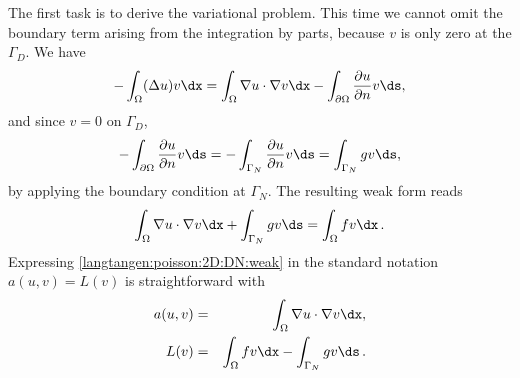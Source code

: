 The first task is to derive the variational problem. This time we
cannot omit the boundary term arising from the integration by parts,
because $v$ is only zero at the $\Gamma_D$. We have
\[
 -\int_\Omega (\Delta u)v \dx
= \int_\Omega\nabla u\cdot\nabla v\dx
  - \int_{\partial\Omega} \frac{\partial u}{\partial n}v\ds,
\]
and since $v=0$ on $\Gamma_D$,
\[
- \int_{\partial\Omega} \frac{\partial u}{\partial n}v\ds
=
- \int_{\Gamma_N} \frac{\partial u}{\partial n}v\ds
= \int_{\Gamma_N}gv\ds,
\]
by applying the boundary condition at $\Gamma_N$.
The resulting weak form reads
\begin{equation}
\int_{\Omega} \nabla u \cdot \nabla v \dx +
\int_{\Gamma_N} gv\ds
= \int_{\Omega} fv \dx\langtangenep
\label{langtangen:poisson:2D:DN:weak}
\end{equation}
Expressing \eqref{langtangen:poisson:2D:DN:weak}
in the standard notation $a(u,v)=L(v)$ is straightforward with
\begin{eqnarray}
a(u, v) &=& \int_{\Omega} \nabla u \cdot \nabla v \dx,
\label{langtangen:poisson2:vard:a}\\
L(v) &=& \int_{\Omega} fv \dx -
\int_{\Gamma_N} gv\ds\langtangenep\label{langtangen:poisson2:vard:L}
\end{eqnarray}

